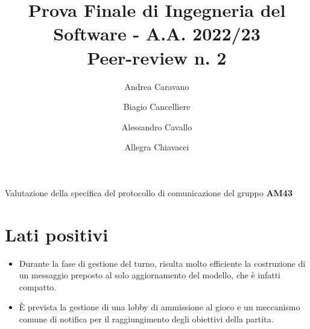 \documentclass[a4paper,11pt]{article} %
\begin{document}
    \pagestyle{fancy}
    \fancyhead{}\fancyfoot{}
    \fancyfoot[C]{\thepage}

    \author{Andrea Caravano \and Biagio Cancelliere \and Alessandro Cavallo \and Allegra Chiavacci}
    \title{\textbf{\Large{Prova Finale di Ingegneria del Software - A.A. 2022/23\\Peer-review n. 2}}}
    \maketitle

    Valutazione della specifica del protocollo di comunicazione del gruppo \textbf{AM43}


    \section{Lati positivi}\label{sec:lati-positivi}
    \begin{itemize}
        \item Durante la fase di gestione del turno, risulta molto efficiente la costruzione
        di un messaggio preposto al solo aggiornamento del modello, che è infatti compatto.
        \item È prevista la gestione di una lobby di ammissione al gioco e un meccanismo comune di
        notifica per il raggiungimento degli obiettivi della partita.
    \end{itemize}
\end{document}
